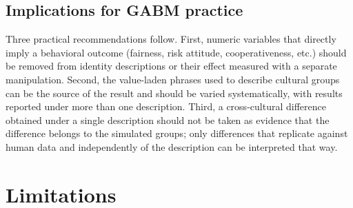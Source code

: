 \documentclass[11pt]{article}
\begin{document}
\subsection{Implications for GABM practice}

Three practical recommendations follow. First, numeric variables that directly imply a behavioral outcome (fairness, risk attitude, cooperativeness, etc.) should be removed from identity descriptions or their effect measured with a separate manipulation. Second, the value-laden phrases used to describe cultural groups can be the source of the result and should be varied systematically, with results reported under more than one description. Third, a cross-cultural difference obtained under a single description should not be taken as evidence that the difference belongs to the simulated groups; only differences that replicate against human data and independently of the description can be interpreted that way.


\section{Limitations}
\end{document}
